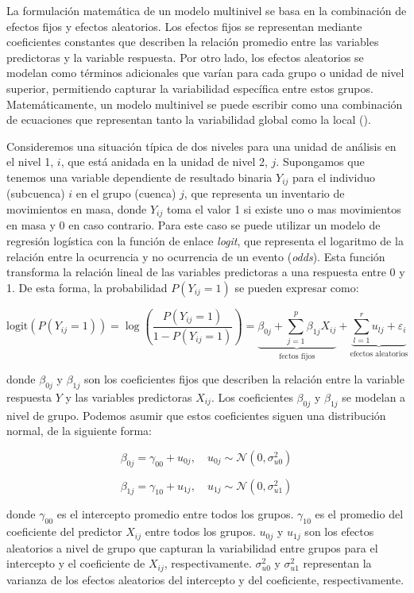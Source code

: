 \documentclass[
  manuscript=article,  
  layout=preprint,  
]{format}
\begin{document}
La formulación matemática de un modelo multinivel se basa en la combinación de efectos fijos y efectos aleatorios. Los efectos fijos se representan mediante coeficientes constantes que describen la relación promedio entre las variables predictoras y la variable respuesta. Por otro lado, los efectos aleatorios se modelan como términos adicionales que varían para cada grupo o unidad de nivel superior, permitiendo capturar la variabilidad específica entre estos grupos. Matemáticamente, un modelo multinivel se puede escribir como una combinación de ecuaciones que representan tanto la variabilidad global como la local (\cite{lee1996hierarchical}).

Consideremos una situación típica de dos niveles para una unidad de análisis en el nivel 1, $i$, que está anidada en la unidad de nivel 2, $j$. Supongamos que tenemos una variable dependiente de resultado binaria $Y_{ij}$ para el individuo (subcuenca) $i$ en el grupo (cuenca) $j$, que representa un inventario de movimientos en masa, donde $Y_{ij}$ toma el valor 1 si existe uno o mas movimientos en masa y 0 en caso contrario. Para este caso se puede utilizar un modelo de regresión logística con la función de enlace \textit{logit}, que representa el logaritmo de la relación entre la ocurrencia y no ocurrencia de un evento (\textit{odds}). Esta función transforma la relación lineal de las variables predictoras a una respuesta entre 0 y 1. De esta forma, la probabilidad $P(Y_{ij} = 1)$ se pueden expresar como:

\[
\text{logit}(P(Y_{ij} = 1)) = \log\left(\frac{P(Y_{ij} = 1)}{1 - P(Y_{ij} = 1)}\right) = \underbrace{\beta_{0j} + \sum_{j=1}^p\beta_{1j}X_{ij}}_\text{fectos fijos}+\underbrace{\sum_{l=1}^ru_{lj} + \varepsilon_i}_\text{efectos aleatorios}
\]

donde $\beta_{0j}$ y $\beta_{1j}$ son los coeficientes fijos que describen la relación entre la variable respuesta $Y$ y las variables predictoras \(X_{ij}\). Los coeficientes $\beta_{0j}$ y $\beta_{1j}$ se modelan a nivel de grupo. Podemos asumir que estos coeficientes siguen una distribución normal, de la siguiente forma:

\[
\beta_{0j} = \gamma_{00} + u_{0j}, \quad u_{0j} \sim \mathcal{N}(0, \sigma^2_{u0})
\]

\[
\beta_{1j} = \gamma_{10} + u_{1j}, \quad u_{1j} \sim \mathcal{N}(0, \sigma^2_{u1})
\]

donde $\gamma_{00}$ es el intercepto promedio entre todos los grupos.
$\gamma_{10}$ es el promedio del coeficiente del predictor $X_{ij}$ entre todos los grupos. $u_{0j}$ y $u_{1j}$ son los efectos aleatorios a nivel de grupo que capturan la variabilidad entre grupos para el intercepto y el coeficiente de $X_{ij}$, respectivamente. $\sigma^2_{u0}$ y $\sigma^2_{u1}$ representan la varianza de los efectos aleatorios del intercepto y del coeficiente, respectivamente.
\end{document}
